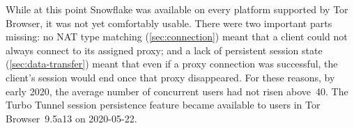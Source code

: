 \documentclass[letterpaper,twocolumn]{article}
\begin{document}
While at this point Snowflake was available
on every platform supported by Tor Browser,
it was not yet comfortably usable.
There were two important parts missing:
no NAT type matching (\autoref{sec:connection})
meant that a client could not always connect to its assigned proxy;
and a lack of persistent session state (\autoref{sec:data-transfer})
meant that even if a proxy connection was successful,
the client's session would end once that proxy disappeared.
For these reasons, by early 2020,
the average number of concurrent users
had not risen above~40.
%
%
The Turbo Tunnel session persistence feature
became available to users in Tor Browser~9.5a13
on \mbox{2020-05-22}.
\end{document}
